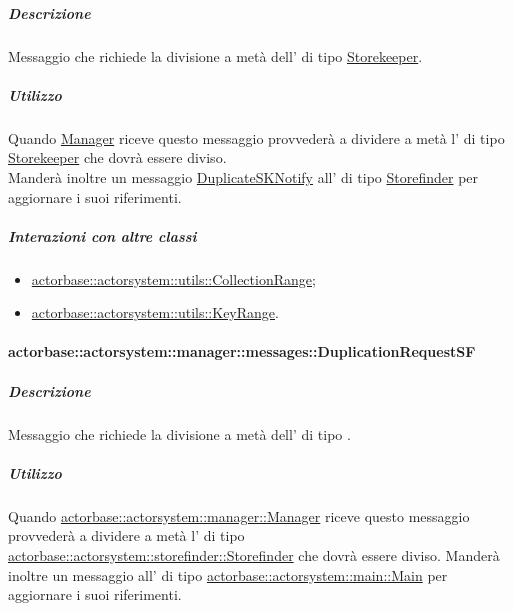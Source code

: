 \documentclass{scalatekids-article}
\begin{document}
\subparagraph{Descrizione}

Messaggio che richiede la divisione a metà dell' di tipo
\hyperref[sec:actorbase::actorsystem::storekeeper::Storekeeper]{Storekeeper}.

\subparagraph{Utilizzo}

Quando \hyperref[sec:actorbase::actorsystem::manager::Manager]{Manager}
riceve questo messaggio provvederà a dividere a metà l' di tipo
\hyperref[sec:actorbase::actorsystem::storekeeper::Storekeeper]{Storekeeper}
che dovrà essere diviso.\\Manderà inoltre un messaggio \hyperref[sec:actorbase::actorsystem::storefinder::messages::DuplicateSKNotify]{DuplicateSKNotify} all' di tipo
\hyperref[sec:actorbase::actorsystem::storefinder::Storefinder]{Storefinder}
per aggiornare i suoi riferimenti.

\subparagraph{Interazioni con altre classi}
\begin{itemize}
\item \hyperref[sec:actorbase::actorsystem::utils::CollectionRange]{actorbase::actorsystem::utils::CollectionRange};
\item \hyperref[sec:actorbase::actorsystem::utils::KeyRange]{actorbase::actorsystem::utils::KeyRange}.
\end{itemize}

\paragraph{actorbase::actorsystem::manager::messages::DuplicationRequestSF}
\label{sec:actorbase::actorsystem::manager::messages::DuplicationRequestSF}

\subparagraph{Descrizione}

Messaggio che richiede la divisione a metà dell' di tipo
.

\subparagraph{Utilizzo}

Quando \hyperref[sec:actorbase::actorsystem::manager::Manager]{actorbase::\allowbreak{}actorsystem::\allowbreak{}manager::\allowbreak{}Manager}
riceve questo messaggio provvederà a dividere a metà l' di tipo
\hyperref[sec:actorbase::actorsystem::storefinder::Storefinder]{actorbase::\allowbreak{}actorsystem::\allowbreak{}storefinder::\allowbreak{}Storefinder}
che dovrà essere diviso. Manderà inoltre un messaggio all' di tipo
\hyperref[sec:actorbase::actorsystem::main::Main]{actorbase::\allowbreak{}actorsystem::\allowbreak{}main::\allowbreak{}Main}
per aggiornare i suoi riferimenti.
\end{document}
